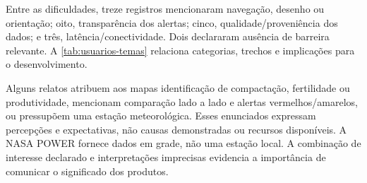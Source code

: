 Entre as dificuldades, treze registros mencionaram navegação, desenho ou orientação; oito, transparência dos alertas; cinco, qualidade/proveniência dos dados; e três, latência/conectividade. Dois declararam ausência de barreira relevante. A \cref{tab:usuarios-temas} relaciona categorias, trechos e implicações para o desenvolvimento.



Alguns relatos atribuem aos mapas identificação de compactação, fertilidade ou produtividade, mencionam comparação lado a lado e alertas vermelhos/amarelos, ou pressupõem uma estação meteorológica. Esses enunciados expressam percepções e expectativas, não causas demonstradas ou recursos disponíveis. A NASA POWER fornece dados em grade, não uma estação local. A combinação de interesse declarado e interpretações imprecisas evidencia a importância de comunicar o significado dos produtos.
